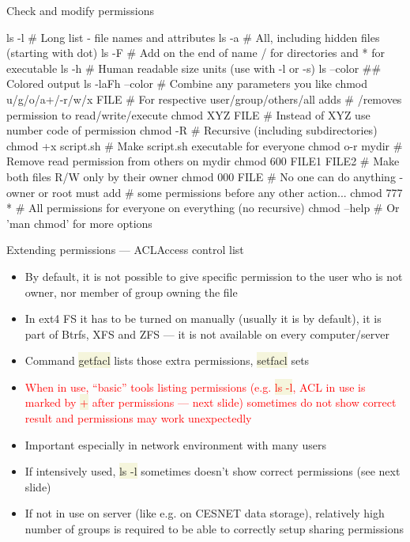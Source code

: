 \documentclass[compress, ucs, xelatex, 11pt, xcolor=svgnames, aspectratio=169,
	hyperref={
		bookmarks=true,
		unicode=true,
		colorlinks=true,
		pdftitle={Linux, command line and MetaCentrum},
		plainpages=false,
		pdfauthor={Vojtech Zeisek},
		pdfsubject={Course about use of Linux command line, writing shell scripts and using MetaCentrum of CESNET},
		pdfcreator={XeLaTeX},
		pdfkeywords={Linux, GNU, BASH, shell, command line, MetaCentrum},
		linkcolor=DarkRed, %
		anchorcolor=DarkBlue, %
		citecolor=Indigo, %
		filecolor=NavyBlue, %
		menucolor=DarkMagenta, %
		urlcolor=DarkBlue, %
		pdftex},
	url={hyphens, lowtilde} %
	]{beamer}
\renewcommand{\texttt}[1]{\colorbox{Beige}{{\ttfamily #1}}}
\renewcommand{\alert}[1]{\textcolor{red}{#1}}
\begin{document}
\begin{frame}[fragile]{Check and modify permissions}
	\begin{bashcode}
    ls -l # Long list - file names and attributes
    ls -a # All, including hidden files (starting with dot)
    ls -F # Add on the end of name / for directories and * for executable
    ls -h # Human readable size units (use with -l or -s)
    ls --color ## Colored output
    ls -laFh --color # Combine any parameters you like
    chmod u/g/o/a+/-r/w/x FILE # For respective user/group/others/all adds
                               # /removes permission to read/write/execute
    chmod XYZ FILE # Instead of XYZ use number code of permission
    chmod -R # Recursive (including subdirectories)
    chmod +x script.sh # Make script.sh executable for everyone
    chmod o-r mydir # Remove read permission from others on mydir
    chmod 600 FILE1 FILE2 # Make both files R/W only by their owner
    chmod 000 FILE # No one can do anything - owner or root must add
                   # some permissions before any other action...
    chmod 777 * # All permissions for everyone on everything (no recursive)
    chmod --help # Or 'man chmod' for more options
	\end{bashcode}
\end{frame}

\begin{frame}{Extending permissions --- ACL}{Access control list}
	\label{acl}
	\begin{itemize}
		\item By default, it is not possible to give specific permission to the user who is not owner, nor member of group owning the file
		\item In ext4 FS it has to be turned on manually (usually it is by default), it is part of Btrfs, XFS and ZFS --- it is not available on every computer/server
		\item Command \texttt{getfacl} lists those extra permissions, \texttt{setfacl} sets
		\item \alert{When in use, \enquote{basic} tools listing permissions (e.g. \texttt{ls -l}, ACL in use is marked by \texttt{+} after permissions --- next slide) sometimes do not show correct result and permissions may work unexpectedly}
		\item Important especially in network environment with many users
		\item If intensively used, \texttt{ls -l} sometimes doesn't show correct permissions (see next slide)
		\item If not in use on server (like e.g. on CESNET data storage), relatively high number of groups is required to be able to correctly setup sharing permissions
	\end{itemize}
\end{frame}
\end{document}
